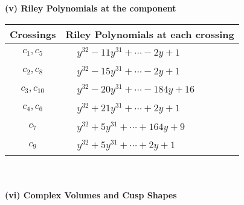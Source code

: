 \documentclass[1p]{elsarticle_modified}
\theoremstyle{definition}
\begin{document}
\newpage\renewcommand{\arraystretch}{1}
\flushleft \textbf{(v) Riley Polynomials at the component}\newline \\
\begin{tabular}{m{50pt}|m{274pt}}
Crossings & \hspace{64pt}Riley Polynomials at each crossing \\
\hline $$\begin{aligned}c_{1},c_{5}\end{aligned}$$&$\begin{aligned}
&y^{32}-11 y^{31}+\cdots-2 y+1
\end{aligned}$\\
\hline $$\begin{aligned}c_{2},c_{8}\end{aligned}$$&$\begin{aligned}
&y^{32}-15 y^{31}+\cdots-2 y+1
\end{aligned}$\\
\hline $$\begin{aligned}c_{3},c_{10}\end{aligned}$$&$\begin{aligned}
&y^{32}-20 y^{31}+\cdots-184 y+16
\end{aligned}$\\
\hline $$\begin{aligned}c_{4},c_{6}\end{aligned}$$&$\begin{aligned}
&y^{32}+21 y^{31}+\cdots+2 y+1
\end{aligned}$\\
\hline $$\begin{aligned}c_{7}\end{aligned}$$&$\begin{aligned}
&y^{32}+5 y^{31}+\cdots+164 y+9
\end{aligned}$\\
\hline $$\begin{aligned}c_{9}\end{aligned}$$&$\begin{aligned}
&y^{32}+5 y^{31}+\cdots+2 y+1
\end{aligned}$\\
\hline
\end{tabular}\\~\\
\newpage\flushleft \textbf{(vi) Complex Volumes and Cusp Shapes}
\end{document}
